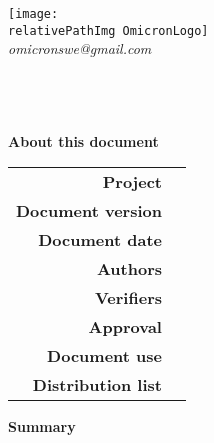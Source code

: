 \begin{titlepage} 

\begin{center}
\texttt{[image: \\relativePathImg OmicronLogo]} \\
\textit{omicronswe@gmail.com}\\[0.7cm]
\HRule \\[0.7cm] \textbf{\huge \doctitle}\\[0.4cm] \HRule \\[1.5cm] 
\par\end{center}{\huge \par}

\begin{center}
	\textbf{\Large About this document} \\[0.2cm]
	\begin{longtable}{ r | p{4cm} }
		\textbf{Project} & \nameproject \\
		\textbf{Document version} & \versiondoc \\
		\textbf{Document date} & \datared \\
		\textbf{Authors} & \parbox[t]{\linewidth}{\redattore} \\
		\textbf{Verifiers} & \parbox[t]{\linewidth}{\verificatori} \\
		\textbf{Approval} & \approvazione \\
		\textbf{Document use} & \usodoc \\
		\textbf{Distribution list} & \parbox[t]{\textwidth}{\listadistr} \\
	\end{longtable}
\vspace{0.7cm}
\textbf{\Large Summary} \\[0.3cm]
\testosommario
\end{center}%

\end{titlepage} 

